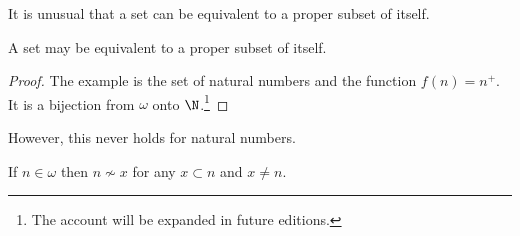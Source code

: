 It is unusual that a set can be equivalent to a proper subset of itself.

\begin{proposition}
A set may be equivalent to a proper subset of itself.
\begin{proof}The example is the set of natural numbers and the function $f(n) = n^+$.
It is a bijection from $\omega $ onto $\N  $.\footnote{The account will be expanded in future editions.}\end{proof}
\end{proposition}

However, this never holds for natural numbers.
\begin{proposition}
If $n \in \omega $ then $n \not\sim x$ for any $x \subset n$ and $x \neq n$.
\end{proposition}
